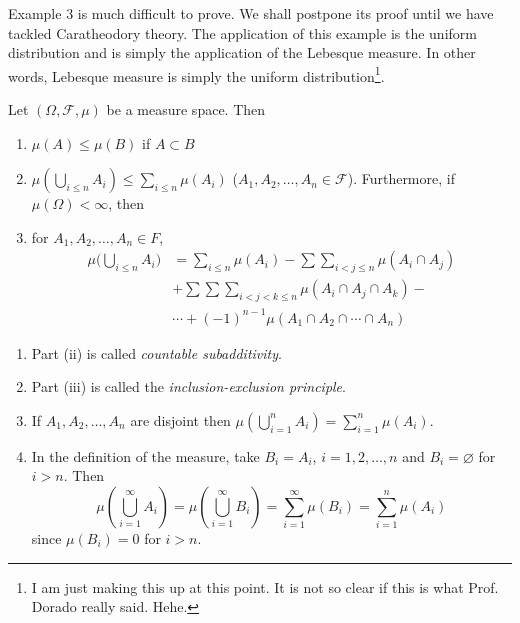 Example 3 is much difficult to prove. We shall postpone its proof until we have tackled Caratheodory theory. The application of this example is the uniform distribution and is simply the application of the Lebesque measure. In other words, Lebesque measure is simply the uniform distribution\footnote{I am just making this up at this point. It is not so clear if this is what Prof. Dorado really said. Hehe.}.


\begin{theorem}\label{thm:measures1}
Let $(\Omega, \mathcal F, \mu)$ be a measure space. Then
\begin{enumerate}[label=\roman*.]
\item $\mu(A)\leq \mu(B)$ if $A\subset B$
\item $\mu(\bigcup_{i\leq n}A_i)\leq \sum_{i\leq n}\mu(A_i)$ ($A_1,A_2,\ldots, A_n\in \mathcal F$).
Furthermore, if $\mu(\Omega)<\infty$, then
\item for $A_1, A_2,\ldots, A_n\in F$,
\begin{equation}\label{eq:measures2}
\begin{aligned}
\mu\Biggl(\bigcup_{i\leq n}A_i\Biggl)&=\sum_{i\leq n}\mu(A_i)-\sum\sum_{i<j\leq n} \mu(A_i\cap A_j)\\
 &+\sum\sum\sum_{i<j<k\leq n}\mu(A_i\cap A_j\cap A_k)-\\
 &\cdots+(-1)^{n-1}\mu(A_1\cap A_2\cap\cdots\cap A_n)
\end{aligned}
\end{equation}
\end{enumerate}
\end{theorem}


\begin{notes}
\begin{enumerate}
\item Part (ii) is called \emph{countable subadditivity}. 
\item Part (iii) is called the \emph{inclusion-exclusion principle}.
\item If $A_1, A_2, \ldots, A_n$ are disjoint then $\mu\left(\bigcup_{i=1}^n A_i\right)=\sum_{i=1}^{n}\mu(A_i)$.
\item In the definition of the measure, take $B_i=A_i$, $i=1,2,\ldots, n$ and $B_i=\varnothing$ for $i>n$. Then 
\begin{equation*}
\mu\left(\bigcup_{i=1}^\infty A_i\right)=\mu\left(\bigcup_{i=1}^\infty B_i\right)=\sum_{i=1}^{\infty}\mu(B_i)=\sum_{i=1}^{n}\mu(A_i)
\end{equation*}
since $\mu(B_i)=0$ for $i>n$.
\end{enumerate}
\end{notes}

